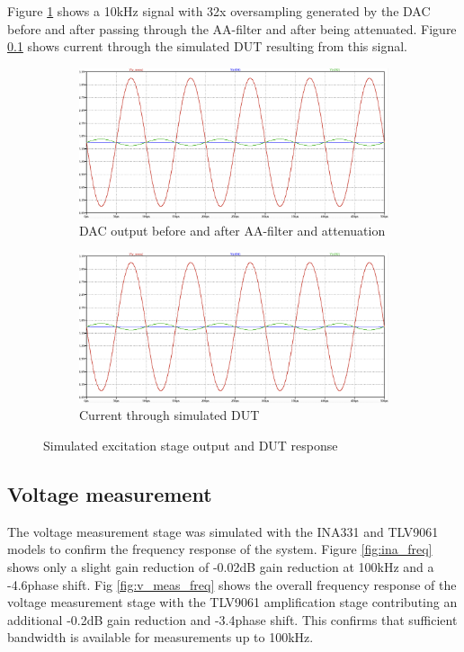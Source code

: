 Figure \ref{fig:dac_filtering} shows a 10kHz signal with 32x oversampling generated by the DAC before and after passing through the AA-filter and after being attenuated. Figure \ref{} shows current through the simulated DUT resulting from this signal.

\begin{figure}[H]
    \centering
    \begin{subfigure}[b]{0.48\textwidth}
        \centering
        \includegraphics[width=\textwidth]{ExcitationStage.png}
        \caption{DAC output before and after AA-filter and attenuation}
        \label{fig:dac_filtering}
    \end{subfigure}\hfill
    \begin{subfigure}[b]{0.48\textwidth}
        \centering
        \includegraphics[width=\textwidth]{ExcitationStage.png}
        \caption{Current through simulated DUT}
        \label{fig:dut_current}
    \end{subfigure}
    \caption{Simulated excitation stage output and DUT response}
    \label{fig:excitation_sim}
\end{figure}

\subsection{Voltage measurement}
The voltage measurement stage was simulated with the INA331 and TLV9061 models to confirm the frequency response of the system. Figure \ref{fig:ina_freq} shows only a slight gain reduction of -0.02dB gain reduction at 100kHz and a -4.6\textdegree phase shift. Fig \ref{fig:v_meas_freq} shows the overall frequency response of the voltage measurement stage with the TLV9061 amplification stage contributing an additional -0.2dB gain reduction and -3.4\textdegree phase shift. This confirms that sufficient bandwidth is available for measurements up to 100kHz.

